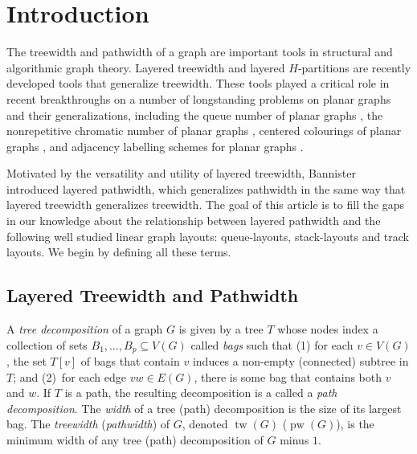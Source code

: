 \documentclass{patmorin}
\DeclareMathOperator{\pw}{pw}
\DeclareMathOperator{\tw}{tw}
\begin{document}

\section{Introduction}

The treewidth and pathwidth of a graph are important tools in
structural and algorithmic graph theory. Layered treewidth and layered
$H$-partitions are recently developed tools that generalize
treewidth. These tools played a critical role in recent breakthroughs on a
number of longstanding problems on planar graphs and their generalizations, including the queue number of planar graphs \cite{dujmovic.joret.ea:planar}, the nonrepetitive chromatic number of planar graphs \cite{dujmovic.esperet.ea:planar}, centered colourings of planar graphs \cite{debski.felsner.ea:improved}, and adjacency labelling schemes for planar graphs \cite{bonamy.gavoille.ea:shorter,dujmovic.esperet.ea:adjacency}.



Motivated
by the versatility and utility of layered treewidth, Bannister
\etal\ \cite{DBLP:conf/gd/BannisterDDEW16,bannister2018track}
introduced  layered pathwidth, which generalizes pathwidth in the same way
that layered treewidth generalizes treewidth.  The goal of this article is to fill the gaps in our knowledge about
the relationship between layered pathwidth and the following well studied
linear graph layouts: queue-layouts, stack-layouts and track
layouts.  We begin by defining all these terms.

\subsection{Layered Treewidth and Pathwidth}

A {\em tree decomposition} of a graph $G$ is given by a tree $T$ whose
nodes index a collection of sets $B_1,\ldots,B_p\subseteq V(G)$ called
\emph{bags} such that (1) for each $v\in V(G)$, the set $T[v]$ of bags that contain $v$ induces a
     non-empty (connected) subtree in $T$; and (2)~for each edge $vw\in E(G)$, there is some bag that contains both $v$ and $w$. If $T$ is a path, the resulting decomposition is a called a \emph{path decomposition}. The \emph{width} of a tree (path)
   decomposition is the size of its largest bag.  The \emph{treewidth}
   (\emph{pathwidth}) of $G$, denoted $\tw(G)$ ($\pw(G)$), is the minimum width of any tree (path) decomposition of $G$ minus $1$.
\end{document}
